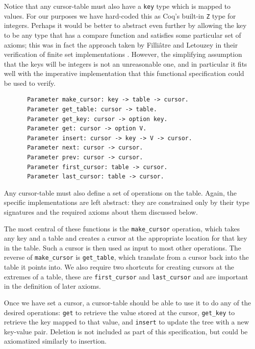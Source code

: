 \documentclass[a4paper,12pt]{article}
\begin{document}
Notice that any cursor-table must also have a \texttt{key} type which is mapped to values. For our purposes we have hard-coded this as Coq’s built-in \texttt{Z} type for integers. Perhaps it would be better to abstract even further by allowing the key to be any type that has a compare function and satisfies some particular set of axioms; this was in fact the approach taken by Filliâtre and Letouzey in their verification of finite set implementations \cite{filliatre:hal-00150913}. However, the simplifying assumption that the keys will be integers is not an unreasonable one, and in particular it fits well with the imperative implementation that this functional specification could be used to verify.

\begin{figure}[h]
\begin{singlespace}
\begin{verbatim}
 Parameter make_cursor: key -> table -> cursor.
 Parameter get_table: cursor -> table.
 Parameter get_key: cursor -> option key.
 Parameter get: cursor -> option V.
 Parameter insert: cursor -> key -> V -> cursor.
 Parameter next: cursor -> cursor.
 Parameter prev: cursor -> cursor.
 Parameter first_cursor: table -> cursor.
 Parameter last_cursor: table -> cursor.
\end{verbatim}
\end{singlespace}
\end{figure}

Any cursor-table must also define a set of operations on the table. Again, the specific implementations are left abstract: they are constrained only by their type signatures and the required axioms about them discussed below.

The most central of these functions is the \texttt{make\_cursor} operation, which takes any key and a table and creates a cursor at the appropriate location for that key in the table. Such a cursor is then used as input to most other operations. The reverse of \texttt{make\_cursor} is \texttt{get\_table}, which translate from a cursor back into the table it points into. We also require two shortcuts for creating cursors at the extremes of a table, these are \texttt{first\_cursor} and \texttt{last\_cursor} and are important in the definition of later axioms.

Once we have set a cursor, a cursor-table should be able to use it to do any of the desired operations: \texttt{get} to retrieve the value stored at the cursor, \texttt{get\_key} to retrieve the key mapped to that value, and \texttt{insert} to update the tree with a new key-value pair. Deletion is not included as part of this specification, but could be axiomatized similarly to insertion.
\end{document}

